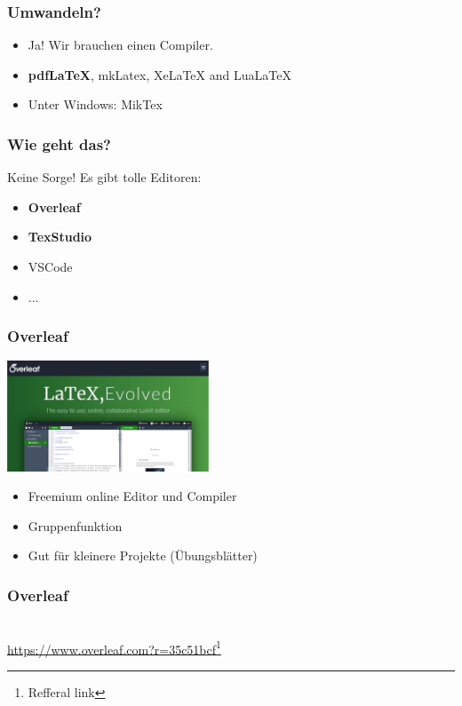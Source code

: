 \documentclass{beamer}
\begin{document}
\begin{frame}
     \frametitle{Umwandeln?}
     \begin{itemize}[<+->]
          \item Ja! Wir brauchen einen Compiler.
               \item \textbf{pdfLaTeX}, mkLatex, XeLaTeX and LuaLaTeX
               \item Unter Windows: MikTex
     \end{itemize}
\end{frame}




\begin{frame}
     \frametitle{Wie geht das?}
     Keine Sorge! Es gibt tolle Editoren:
     \begin{itemize}[<+->]
          \item \textbf{Overleaf}
          \item \textbf{TexStudio}
          \item VSCode
          \item ...
     \end{itemize}
\end{frame}

\begin{frame}
    \frametitle{Overleaf}
    \includegraphics[width=6cm]{pictures/overleaf.png}
    \begin{itemize}[<+->]
        \item Freemium online Editor und Compiler
        \item Gruppenfunktion
        \item Gut für kleinere Projekte (Übungsblätter)
    \end{itemize}
\end{frame}


\begin{frame}
    \frametitle{Overleaf}
    \centering
    \\
    \url{https://www.overleaf.com?r=35c51bcf}\footnote{Refferal link}
\end{frame}
\end{document}
